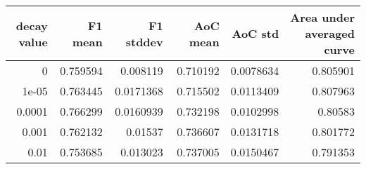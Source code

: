 \begin{tabular}{rrrrrr}
\toprule
   decay value &   F1 mean &   F1 stddev &   AoC mean &   AoC std &   Area under averaged curve \\
\midrule
        0      &  0.759594 &   0.008119  &   0.710192 & 0.0078634 &                    0.805901 \\
        1e-05  &  0.763445 &   0.0171368 &   0.715502 & 0.0113409 &                    0.807963 \\
        0.0001 &  0.766299 &   0.0160939 &   0.732198 & 0.0102998 &                    0.80583  \\
        0.001  &  0.762132 &   0.01537   &   0.736607 & 0.0131718 &                    0.801772 \\
        0.01   &  0.753685 &   0.013023  &   0.737005 & 0.0150467 &                    0.791353 \\
\bottomrule
\end{tabular}